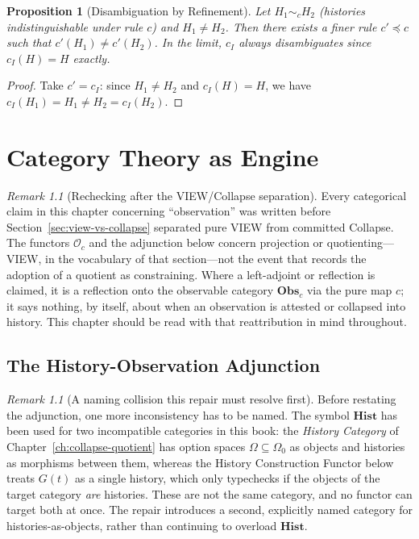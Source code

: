 \documentclass[12pt, a4paper, openany]{book}
\theoremstyle{plain}
\newtheorem{proposition}[theorem]{Proposition}
\theoremstyle{definition}
\theoremstyle{remark}
\newtheorem{remark}[theorem]{Remark}
\newcommand{\Hist}{\mathbf{Hist}}
\newcommand{\Obs}{\mathbf{Obs}}
\begin{document}
\begin{proposition}[Disambiguation by Refinement]
Let $H_1 \sim_c H_2$ (histories indistinguishable under rule $c$) and $H_1 \neq H_2$.
Then there exists a finer rule $c' \preceq c$ such that $c'(H_1) \neq c'(H_2)$.
In the limit, $c_I$ always disambiguates since $c_I(H) = H$ exactly.
\end{proposition}

\begin{proof}
Take $c' = c_I$: since $H_1 \neq H_2$ and $c_I(H) = H$, we have
$c_I(H_1) = H_1 \neq H_2 = c_I(H_2)$.
\end{proof}

\chapter{Category Theory as Engine}

\begin{remark}[Rechecking after the VIEW/Collapse separation]
Every categorical claim in this chapter concerning ``observation'' was written
before Section~\ref{sec:view-vs-collapse} separated pure VIEW from committed
Collapse. The functors $\mathcal{O}_c$ and the adjunction below concern
projection or quotienting---VIEW, in the vocabulary of that section---not the
event that records the adoption of a quotient as constraining. Where a
left-adjoint or reflection is claimed, it is a reflection onto the observable
category $\Obs_c$ via the pure map $c$; it says nothing, by itself, about when
an observation is attested or collapsed into history. This chapter should be
read with that reattribution in mind throughout.
\end{remark}

\section{The History-Observation Adjunction}

\begin{remark}[A naming collision this repair must resolve first]
Before restating the adjunction, one more inconsistency has to be named. The
symbol $\Hist$ has been used for two incompatible categories in this book: the
\emph{History Category} of Chapter~\ref{ch:collapse-quotient} has option spaces
$\Omega \subseteq \Omega_0$ as objects and histories as morphisms between them,
whereas the History Construction Functor below treats $G(t)$ as a single
history, which only typechecks if the objects of the target category
\emph{are} histories. These are not the same category, and no functor can
target both at once. The repair introduces a second, explicitly named
category for histories-as-objects, rather than continuing to overload $\Hist$.
\end{remark}
\end{document}
